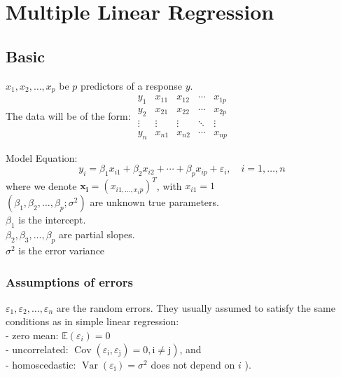 \documentclass[11pt,a4paper]{article}
\begin{document}
\section{Multiple Linear Regression}
\subsection{Basic}
$x_{1}, x_{2}, \ldots, x_{p}$ be $p$ predictors of a response $y$.\\
The data will be of the form:
$\begin{array}{ccccc}y_{1} & x_{11} & x_{12} & \cdots & x_{1 p} \\ y_{2} & x_{21} & x_{22} & \cdots & x_{2 p} \\ \vdots & \vdots & \vdots & \ddots & \vdots \\ y_{n} & x_{n 1} & x_{n 2} & \cdots & x_{n p}\end{array}$

Model Equation:
$$
y_{i}=\beta_{1} x_{i 1}+\beta_{2} x_{i 2}+\cdots+\beta_{p} x_{i p}+\varepsilon_{i}, \quad i=1, \ldots, n
$$
where we denote $\mathbf{x}_{\mathbf{i}}=\left(x_{i 1, \ldots, x_{i} p}\right)^{T}$, with $x_{i 1}=1$\\
$\left(\beta_{1}, \beta_{2}, \ldots, \beta_{p} ; \sigma^{2}\right)$ are unknown true parameters.\\
$\beta_{1}$ is the intercept.\\
$\beta_{2}, \beta_{3}, \ldots, \beta_{p}$ are partial slopes.\\
$\sigma^{2}$ is the error variance
\subsubsection{Assumptions of errors}
$\varepsilon_{1}, \varepsilon_{2}, \ldots, \varepsilon_{n}$ are the random errors. They usually assumed to satisfy the same conditions as in simple linear regression:\\
- zero mean: $\mathbb{E}\left(\varepsilon_{i}\right)=0$\\
- uncorrelated: $\left.\operatorname{Cov}\left(\varepsilon_{\mathrm{i}}, \varepsilon_{\mathrm{j}}\right)=0, \mathrm{i} \neq \mathrm{j}\right)$, and\\
- homoscedastic: $\operatorname{Var}\left(\varepsilon_{\mathrm{i}}\right)=\sigma^{2}$ does not depend on $i$ ).
\end{document}
